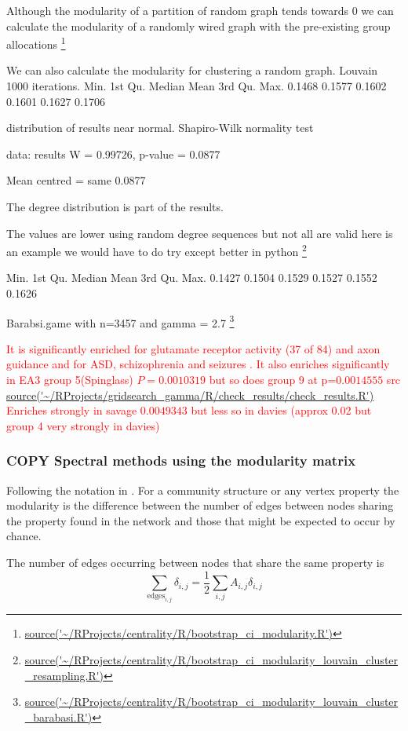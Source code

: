 Although the modularity of a partition of random graph tends towards 0 we can calculate the modularity of a randomly wired graph with the pre-existing group allocations \footnote{\url{source('~/RProjects/centrality/R/bootstrap_ci_modularity.R')}}

We can also calculate the modularity for clustering a random graph. Louvain 1000 iterations.
  Min. 1st Qu.  Median    Mean 3rd Qu.    Max. 
 0.1468  0.1577  0.1602  0.1601  0.1627  0.1706 
 
 distribution of results near normal. 	Shapiro-Wilk normality test

data:  results
W = 0.99726, p-value = 0.0877

Mean centred = same 0.0877

The degree distribution is part of the results. 

The values are lower using random degree sequences but not all are valid here is an example we would have to do try except better in python \footnote{\url{source('~/RProjects/centrality/R/bootstrap_ci_modularity_louvain_cluster_resampling.R')}}

   Min. 1st Qu.  Median    Mean 3rd Qu.    Max. 
 0.1427  0.1504  0.1529  0.1527  0.1552  0.1626 
 
 Barabsi.game with n=3457 and gamma = 2.7
 \footnote{\url{source('~/RProjects/centrality/R/bootstrap_ci_modularity_louvain_cluster_barabasi.R')}}
 

\textcolor{red}{It is significantly enriched for glutamate receptor activity (37 of 84) and axon guidance and for ASD, schizophrenia and seizures . It also enriches significantly in EA3 group 5(Spinglass) $P=0.0010319$ but so does group 9 at p=$0.0014555$ src \url{source('~/RProjects/gridsearch_gamma/R/check_results/check_results.R')}
Enriches strongly in savage $0.0049343$ but less so in davies (approx 0.02 but group 4 very strongly in davies)}

\subsubsection{COPY Spectral methods using the modularity matrix}

Following the notation in \cite{newman2018networks}. For a community structure or any vertex property the modularity is the difference between the number of edges between nodes sharing the property found in the network and those that might be expected to occur by chance.

The number of edges occurring between nodes that share the same property is
\begin{equation}
    \sum_{\textrm{edges}_{i,j}} \delta_{i,j} = \frac{1}{2} \sum_{i,j} A_{i,j} \delta_{i,j}
    \label{eq:edges_from_adjacency}
\end{equation}


